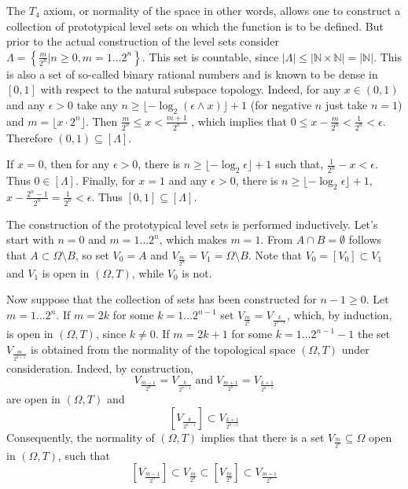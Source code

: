 \documentclass[a4paper]{article}
\newcommand{\obj}[1]{\left\{{#1}\right\}}
\newcommand{\clo}[1]{\left [{#1}\right]}
\newcommand{\brac}[1]{{\left({#1}\right)}}
\newcommand{\abs}[1]{\left | {#1}\right |}
\begin{document}
The $T_4$ axiom, or normality of the space in other words, allows one to construct a collection of prototypical level sets on which the function is to be defined. But prior to the actual construction of the level sets consider $\Lambda = \obj{ \frac{m}{2^n} \vert n\geq 0, m = 1\ldots 2^n}$. This set is countable, since $\abs{\Lambda} \leq \abs{\mathbb{N}\times\mathbb{N}} = \abs{\mathbb{N}}$. This is also a set of so-called binary rational numbers and is known to be dense in $\clo{0, 1}$ with respect to the natural subspace topology. Indeed, for any $x \in \brac{0,1}$ and any $\epsilon>0$ take any $n \geq \lfloor -\log_2 \brac{\epsilon\wedge x} \rfloor + 1$ (for negative $n$ just take $n=1$) and $m = \lfloor x \cdot 2^n \rfloor$. Then $\frac{m}{2^n} \leq x < \frac{m+1}{2^n}$ , which implies that $0\leq x - \frac{m}{2^n} < \frac{1}{2^n} < \epsilon$. Therefore $\brac{0,1}\subseteq \clo{\Lambda}$.

If $x = 0$, then for any $\epsilon > 0$, there is $n \geq \lfloor -\log_2 \epsilon \rfloor + 1$ such that, $\frac{1}{2^n} - x < \epsilon$. Thus $0\in \clo{\Lambda}$. Finally, for $x=1$ and any $\epsilon > 0$, there is $n \geq \lfloor -\log_2 \epsilon \rfloor + 1$, $x - \frac{2^n-1}{2^n} = \frac{1}{2^n} < \epsilon$. Thus $\clo{0,1} \subseteq \clo{\Lambda}$.

The construction of the prototypical level sets is performed inductively. 
Let's start with $n=0$ and $m=1\ldots 2^n$, which makes $m=1$. From $A\cap B = \emptyset$ follows that $A\subset \Omega \setminus B$, so set $V_0 = A$ and $V_{\frac{m}{2^n}} = V_1 = \Omega \setminus B$. Note that $V_0 = \clo{V_0}\subset V_1$ and $V_1$ is open in $\brac{\Omega, T}$, while $V_0$ is not.

Now suppose that the collection of sets has been constructed for $n-1 \geq 0$. Let $m = 1\ldots 2^n$. If $m=2k$ for some $k=1\ldots 2^{n-1}$ set $V_{\frac{m}{2^n}} = V_{\frac{k}{2^{n-1}}}$, which, by induction, is open in $\brac{\Omega, T}$, since $k\neq 0$. If $m=2k+1$ for some $k=1\ldots 2^{n-1}-1$ the set $V_{\frac{m}{2^{n+1}}}$ is obtained from the normality of the topological space $\brac{\Omega, T}$ under consideration. Indeed, by construction, \[V_{\frac{m-1}{2^n}} = V_{\frac{k}{2^{n-1}}}\;\text{and}\;V_{\frac{m+1}{2^n}} = V_{\frac{k+1}{2^{n-1}}}\] are open in $\brac{\Omega, T}$ and \[\clo{V_{\frac{k}{2^{n-1}}}} \subset V_{\frac{k+1}{2^{n-1}}}\] Consequently, the normality of $\brac{\Omega, T}$ implies that there is a set $V_{\frac{m}{2^n}}\subseteq \Omega$ open in $\brac{\Omega, T}$, such that \[\clo{V_{\frac{m-1}{2^n}}} \subset V_{\frac{m}{2^n}} \subset \clo{V_{\frac{m}{2^n}}} \subset V_{\frac{m+1}{2^n}}\]
\end{document}
